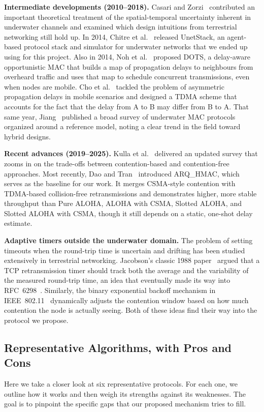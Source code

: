 \documentclass{article}
\begin{document}
\textbf{Intermediate developments (2010--2018).} Casari and Zorzi~\cite{casari2011} contributed an important theoretical treatment of the spatial-temporal uncertainty inherent in underwater channels and examined which design intuitions from terrestrial networking still hold up. In 2014, Chitre et al.~\cite{unetstack2014} released UnetStack, an agent-based protocol stack and simulator for underwater networks that we ended up using for this project. Also in 2014, Noh et al.~\cite{dots2014} proposed DOTS, a delay-aware opportunistic MAC that builds a map of propagation delays to neighbours from overheard traffic and uses that map to schedule concurrent transmissions, even when nodes are mobile. Cho et al.~\cite{cho2018} tackled the problem of asymmetric propagation delays in mobile scenarios and designed a TDMA scheme that accounts for the fact that the delay from A to B may differ from B to A. That same year, Jiang~\cite{jiang2018} published a broad survey of underwater MAC protocols organized around a reference model, noting a clear trend in the field toward hybrid designs.

\textbf{Recent advances (2019--2025).} Kulla et al.~\cite{kulla2022} delivered an updated survey that zooms in on the trade-offs between contention-based and contention-free approaches. Most recently, Dao and Tran~\cite{dao2025} introduced ARQ\_HMAC, which serves as the baseline for our work. It merges CSMA-style contention with TDMA-based collision-free retransmissions and demonstrates higher, more stable throughput than Pure ALOHA, ALOHA with CSMA, Slotted ALOHA, and Slotted ALOHA with CSMA, though it still depends on a static, one-shot delay estimate.

\textbf{Adaptive timers outside the underwater domain.} The problem of setting timeouts when the round-trip time is uncertain and drifting has been studied extensively in terrestrial networking. Jacobson's classic 1988 paper~\cite{jacobson1988} argued that a TCP retransmission timer should track both the average and the variability of the measured round-trip time, an idea that eventually made its way into RFC~6298~\cite{rfc6298}. Similarly, the binary exponential backoff mechanism in IEEE~802.11~\cite{ieee80211} dynamically adjusts the contention window based on how much contention the node is actually seeing. Both of these ideas find their way into the protocol we propose.

\subsection{Representative Algorithms, with Pros and Cons} \label{sec:representative}
Here we take a closer look at six representative protocols. For each one, we outline how it works and then weigh its strengths against its weaknesses. The goal is to pinpoint the specific gaps that our proposed mechanism tries to fill.
\end{document}
